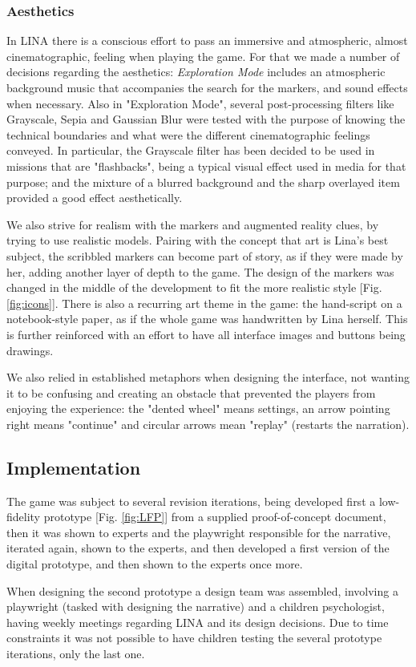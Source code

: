 \subsubsection{Aesthetics}
\par In LINA there is a conscious effort to pass an immersive and atmospheric, almost cinematographic, feeling when playing the game. For that we made a number of decisions regarding the aesthetics: \textit{Exploration Mode} includes an atmospheric background music that accompanies the search for the markers, and sound effects when necessary. Also in "Exploration Mode", several post-processing filters like Grayscale, Sepia and Gaussian Blur were tested with the purpose of knowing the technical boundaries and what were the different cinematographic feelings conveyed. In particular, the Grayscale filter has been decided to be used in missions that are "flashbacks", being a typical visual effect used in media for that purpose; and the mixture of a blurred background and the sharp overlayed item provided a good effect aesthetically.
\par We also strive for realism with the markers and augmented reality clues, by trying to use realistic models. Pairing with the concept that art is Lina's best subject, the scribbled markers can become part of story, as if they were made by her, adding another layer of depth to the game. The design of the markers was changed in the middle of the development to fit the more realistic style [Fig.\ref{fig:icons}].
There is also a recurring art theme in the game: the hand-script on a notebook-style paper, as if the whole game was handwritten by Lina herself. This is further reinforced with an effort to have all interface images and buttons being drawings.
\par We also relied in established metaphors when designing the interface, not wanting it to be confusing and creating an obstacle that prevented the players from enjoying the experience: the "dented wheel" means settings, an arrow pointing right means "continue" and circular arrows mean "replay" (restarts the narration).


\subsection{Implementation}
The game was subject to several revision iterations, being developed first a low-fidelity prototype [Fig. \ref{fig:LFP}] from a supplied proof-of-concept document, then it was shown to experts and the playwright responsible for the narrative, iterated again, shown to the experts, and then developed a first version of the digital prototype, and then shown to the experts once more.
\par When designing the second prototype a design team was assembled, involving a playwright\cite{adam_barnard_2019} (tasked with designing the narrative) and a children psychologist, having weekly meetings regarding LINA and its design decisions. Due to time constraints it was not possible to have children testing the several prototype iterations, only the last one.

